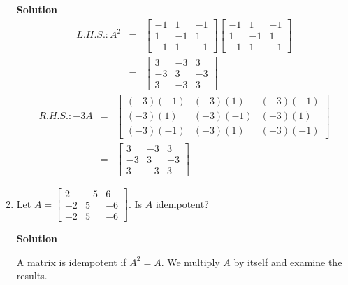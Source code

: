 \begin{enumerate}
\noindent \textbf{Solution}
\begin{eqnarray*}
L.H.S. : A^{2} &=&\left[\begin{array}{rrr}
                           -1&1&-1\\
                           1&-1&1\\
                           -1&1&-1\end{array} \right]
\left[\begin{array}{rrr}  -1&1&-1\\
                           1&-1&1\\
                           -1&1&-1\end{array} \right]
                           \\
&=&\left[ \begin{array}{rrr}
                           3&-3&3\\
                           -3&3&-3\\
                           3&-3&3\end{array} \right]
\end{eqnarray*}
\begin{eqnarray*}
R.H.S. : -3A &=&\left[ \begin{array}{rrr}
                           (-3)(-1)&(-3)(1)&(-3)(-1)\\
                           (-3)(1)&(-3)(-1)&(-3)(1)\\
                           (-3)(-1)&(-3)(1)&(-3)(-1)\end{array} \right]\\
&=&\left[ \begin{array}{rrr}
                           3&-3&3\\
                           -3&3&-3\\
                           3&-3&3\end{array} \right]
\end{eqnarray*}
\item Let $A=\left [ \begin{array}{rrr} 2&-5&6\\ -2&5&-6\\
-2&5&-6 \end{array} \right ]$. Is $A$ idempotent?

\noindent \textbf{Solution}

\noindent A matrix is idempotent if $A^{2}=A$. We multiply $A$ by
itself and examine the results.


\end{enumerate}
